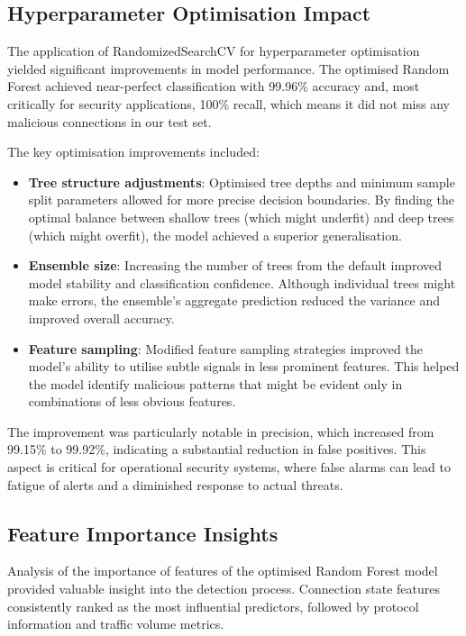 \subsection{Hyperparameter Optimisation Impact}

The application of RandomizedSearchCV for hyperparameter optimisation yielded significant improvements in model performance. The optimised Random Forest achieved near-perfect classification with 99.96\% accuracy and, most critically for security applications, 100\% recall, which means it did not miss any malicious connections in our test set.

The key optimisation improvements included:

\begin{itemize}
    \item \textbf{Tree structure adjustments}: Optimised tree depths and minimum sample split parameters allowed for more precise decision boundaries. By finding the optimal balance between shallow trees (which might underfit) and deep trees (which might overfit), the model achieved a superior generalisation.
    
    \item \textbf{Ensemble size}: Increasing the number of trees from the default improved model stability and classification confidence. Although individual trees might make errors, the ensemble's aggregate prediction reduced the variance and improved overall accuracy.
    
    \item \textbf{Feature sampling}: Modified feature sampling strategies improved the model's ability to utilise subtle signals in less prominent features. This helped the model identify malicious patterns that might be evident only in combinations of less obvious features.
\end{itemize}

The improvement was particularly notable in precision, which increased from 99.15\% to 99.92\%, indicating a substantial reduction in false positives. This aspect is critical for operational security systems, where false alarms can lead to fatigue of alerts and a diminished response to actual threats.

\subsection{Feature Importance Insights}

Analysis of the importance of features of the optimised Random Forest model provided valuable insight into the detection process. Connection state features consistently ranked as the most influential predictors, followed by protocol information and traffic volume metrics.

